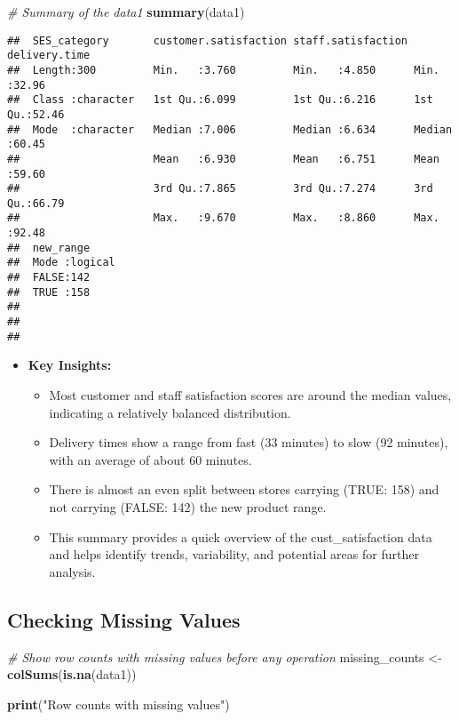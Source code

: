 \documentclass[
]{article}
\newenvironment{Shaded}{\begin{snugshade}}{\end{snugshade}}
\newcommand{\CommentTok}[1]{\textcolor[rgb]{0.56,0.35,0.01}{\textit{#1}}}
\newcommand{\FunctionTok}[1]{\textcolor[rgb]{0.13,0.29,0.53}{\textbf{#1}}}
\newcommand{\NormalTok}[1]{#1}
\newcommand{\OtherTok}[1]{\textcolor[rgb]{0.56,0.35,0.01}{#1}}
\newcommand{\StringTok}[1]{\textcolor[rgb]{0.31,0.60,0.02}{#1}}
\providecommand{\tightlist}{%
  \setlength{\itemsep}{0pt}\setlength{\parskip}{0pt}}
\begin{document}
\begin{Shaded}
\begin{Highlighting}[]
\CommentTok{\# Summary of the data1}
\FunctionTok{summary}\NormalTok{(data1)}
\end{Highlighting}
\end{Shaded}

\begin{verbatim}
##  SES_category       customer.satisfaction staff.satisfaction delivery.time  
##  Length:300         Min.   :3.760         Min.   :4.850      Min.   :32.96  
##  Class :character   1st Qu.:6.099         1st Qu.:6.216      1st Qu.:52.46  
##  Mode  :character   Median :7.006         Median :6.634      Median :60.45  
##                     Mean   :6.930         Mean   :6.751      Mean   :59.60  
##                     3rd Qu.:7.865         3rd Qu.:7.274      3rd Qu.:66.79  
##                     Max.   :9.670         Max.   :8.860      Max.   :92.48  
##  new_range      
##  Mode :logical  
##  FALSE:142      
##  TRUE :158      
##                 
##                 
## 
\end{verbatim}

\begin{itemize}
\tightlist
\item
  \textbf{Key Insights:}

  \begin{itemize}
  \tightlist
  \item
    Most customer and staff satisfaction scores are around the median
    values, indicating a relatively balanced distribution.
  \item
    Delivery times show a range from fast (33 minutes) to slow (92
    minutes), with an average of about 60 minutes.
  \item
    There is almost an even split between stores carrying (TRUE: 158)
    and not carrying (FALSE: 142) the new product range.
  \item
    This summary provides a quick overview of the cust\_satisfaction
    data and helps identify trends, variability, and potential areas for
    further analysis.
  \end{itemize}
\end{itemize}

\subsection{Checking Missing Values}\label{checking-missing-values}

\begin{Shaded}
\begin{Highlighting}[]
\CommentTok{\# Show row counts with missing values before any operation}
\NormalTok{missing\_counts }\OtherTok{\textless{}{-}} \FunctionTok{colSums}\NormalTok{(}\FunctionTok{is.na}\NormalTok{(data1))}

\FunctionTok{print}\NormalTok{(}\StringTok{"Row counts with missing values"}\NormalTok{)}
\end{Highlighting}
\end{Shaded}
\end{document}
